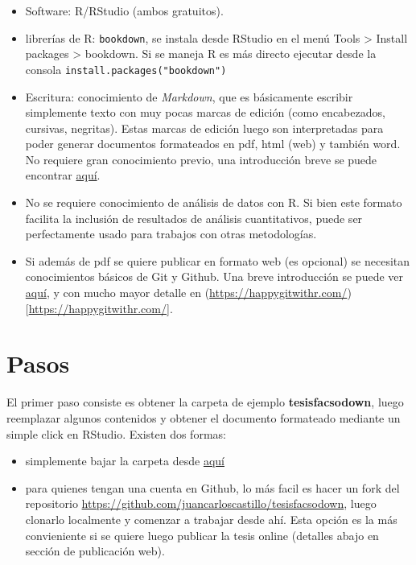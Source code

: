 \documentclass[12pt,twoside]{templates/facsothesis}
\providecommand{\tightlist}{%
  \setlength{\itemsep}{0pt}\setlength{\parskip}{0pt}}
\begin{document}
\begin{itemize}
\item
  Software: R/RStudio (ambos gratuitos).
\item
  librerías de R: \texttt{bookdown}, se instala desde RStudio en el menú Tools \textgreater{} Install packages \textgreater{} bookdown. Si se maneja R es más directo ejecutar desde la consola \texttt{install.packages("bookdown")}
\item
  Escritura: conocimiento de \emph{Markdown}, que es básicamente escribir simplemente texto con muy pocas marcas de edición (como encabezados, cursivas, negritas). Estas marcas de edición luego son interpretadas para poder generar documentos formateados en pdf, html (web) y también word. No requiere gran conocimiento previo, una introducción breve se puede encontrar \href{https://juancarloscastillo.github.io/in-socabi/lenguaje-reproducible.html}{aquí}.
\item
  No se requiere conocimiento de análisis de datos con R. Si bien este formato facilita la inclusión de resultados de análisis cuantitativos, puede ser perfectamente usado para trabajos con otras metodologías.
\item
  Si además de pdf se quiere publicar en formato web (es opcional) se necesitan conocimientos básicos de Git y Github. Una breve introducción se puede ver \href{https://cienciasocialabierta.netlify.app/class/08-class/}{aquí}, y con mucho mayor detalle en (\url{https://happygitwithr.com/}){[}\url{https://happygitwithr.com/}{]}.
\end{itemize}

\hypertarget{pasos}{%
\section{Pasos}\label{pasos}}

El primer paso consiste es obtener la carpeta de ejemplo \textbf{tesisfacsodown}, luego reemplazar algunos contenidos y obtener el documento formateado mediante un simple click en RStudio. Existen dos formas:

\begin{itemize}
\tightlist
\item
  simplemente bajar la carpeta desde \href{}{aquí}
\item
  para quienes tengan una cuenta en Github, lo más facil es hacer un fork del repositorio \url{https://github.com/juancarloscastillo/tesisfacsodown}, luego clonarlo localmente y comenzar a trabajar desde ahí. Esta opción es la más convieniente si se quiere luego publicar la tesis online (detalles abajo en sección de publicación web).
\end{itemize}
\end{document}
